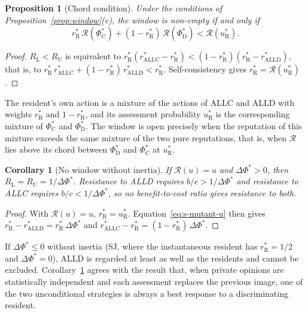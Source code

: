 \documentclass[10pt]{wlscirep}
\newcommand{\Rmap}{\mathscr{R}}            %
\newcommand{\rR}{r_{\mathrm{R}}^{*}}
\newcommand{\uR}{u_{\mathrm{R}}^{*}}
\newcommand{\PhiCs}{\Phi^{*}_{\mathrm{C}}}
\newcommand{\PhiDs}{\Phi^{*}_{\mathrm{D}}}
\newcommand{\dPhi}{\Delta\Phi^{*}}
\newcommand{\ALLC}{\mathrm{ALLC}}
\newcommand{\ALLD}{\mathrm{ALLD}}
\theoremstyle{plain}
\newtheorem{proposition}[lemma]{Proposition}
\newtheorem{corollary}[lemma]{Corollary}
\theoremstyle{remark}
\begin{document}
\begin{proposition}[Chord condition]\label{prop:chord}
Under the conditions of Proposition~\ref{prop:window}(c), the window is non-empty if and only if
\begin{equation}
\rR\,\Rmap(\PhiCs)+(1-\rR)\,\Rmap(\PhiDs)<\Rmap(\uR).
\label{eq:s-chord}
\end{equation}
\end{proposition}
\begin{proof}
$R_{\mathrm L}<R_{\mathrm U}$ is equivalent to $\rR(r^*_{\ALLC}-\rR)<(1-\rR)(\rR-r^*_{\ALLD})$, that is, to $\rR\,r^*_{\ALLC}+(1-\rR)\,r^*_{\ALLD}<\rR$. Self-consistency gives $\rR=\Rmap(\uR)$.
\end{proof}

The resident's own action is a mixture of the actions of ALLC and ALLD with weights $\rR$ and $1-\rR$, and its assessment probability $\uR$ is the corresponding mixture of $\PhiCs$ and $\PhiDs$. The window is open precisely when the reputation of this mixture exceeds the same mixture of the two pure reputations, that is, when $\Rmap$ lies above its chord between $\PhiDs$ and $\PhiCs$ at $\uR$.

\begin{corollary}[No window without inertia]\label{cor:nowindow}
If $\Rmap(u)=u$ and $\dPhi>0$, then $R_{\mathrm L}=R_{\mathrm U}=1/\dPhi$. Resistance to ALLD requires $b/c>1/\dPhi$ and resistance to ALLC requires $b/c<1/\dPhi$, so no benefit-to-cost ratio gives resistance to both.
\end{corollary}
\begin{proof}
With $\Rmap(u)=u$, $\rR=\uR$. Equation~\eqref{eq:s-mutant-u} then gives $\rR-r^*_{\ALLD}=\rR\,\dPhi$ and $r^*_{\ALLC}-\rR=(1-\rR)\,\dPhi$.
\end{proof}

If $\dPhi\leq0$ without inertia (SJ, where the instantaneous resident has $\rR=1/2$ and $\dPhi=0$), ALLD is regarded at least as well as the residents and cannot be excluded. Corollary~\ref{cor:nowindow} agrees with the result that, when private opinions are statistically independent and each assessment replaces the previous image, one of the two unconditional strategies is always a best response to a discriminating resident.
\end{document}

